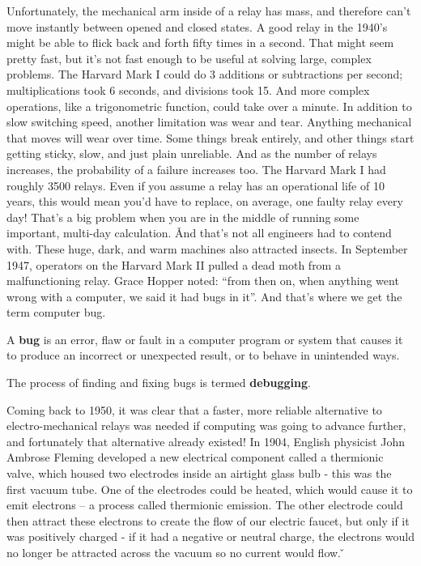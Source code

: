 Unfortunately, the mechanical arm inside of a relay has mass, and therefore can't move instantly between opened and
closed states. A good relay in the 1940's might be able to flick back and forth fifty times in a second. That might
seem pretty fast, but it's not fast enough to be useful at solving large, complex problems. The Harvard Mark I could
do 3 additions or subtractions per second; multiplications took 6 seconds, and divisions took 15. And more complex
operations, like a trigonometric function, could take over a minute. In addition to slow switching speed, another
limitation was wear and tear. Anything mechanical that moves will wear over time. Some things break entirely, and
other things start getting sticky, slow, and just plain unreliable. And as the number of relays increases, the
probability of a failure increases too. The Harvard Mark I had roughly 3500 relays. Even if you assume a relay has an
operational life of 10 years, this would mean you'd have to replace, on average, one faulty relay every day! That's a
big problem when you are in the middle of running some important, multi-day calculation. \v

And that's not all engineers had to contend with. These huge, dark, and warm machines also attracted insects. In
September 1947, operators on the Harvard Mark II pulled a dead moth from a malfunctioning relay. Grace Hopper noted:
``from then on, when anything went wrong with a computer, we said it had bugs in it''. And that's where we get the term
computer bug.

\bd[Bug]
A \textbf{bug} is an error, flaw or fault in a computer program or system that causes it to produce an incorrect or
unexpected result, or to behave in unintended ways.
\ed

\bd[Debugging]
The process of finding and fixing bugs is termed \textbf{debugging}.
\ed

Coming back to 1950, it was clear that a faster, more reliable alternative to electro-mechanical relays was needed if
computing was going to advance further, and fortunately that alternative already existed! In 1904, English physicist
John Ambrose Fleming developed a new electrical component called a thermionic valve, which housed two electrodes
inside an airtight glass bulb - this was the first vacuum tube. One of the electrodes could be heated, which would
cause it to emit electrons – a process called thermionic emission. The other electrode could then attract these
electrons to create the flow of our electric faucet, but only if it was positively charged - if it had a negative or
neutral charge, the electrons would no longer be attracted across the vacuum so no current would flow. \v

